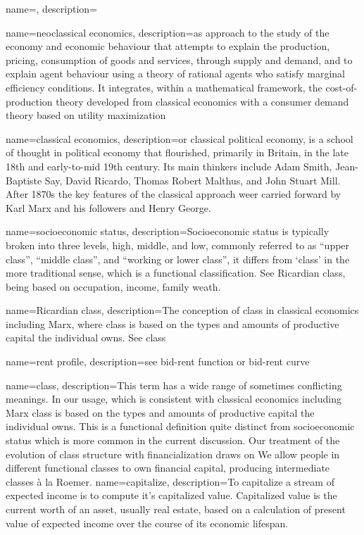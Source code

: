 

\newglossaryentry{}
{
name=,
description={}
}

{
name=neoclassical economics,
description={as approach to the study of the economy and economic behaviour that attempts to explain the production, pricing, consumption of goods and services,  through supply and demand, and to explain agent behaviour using a theory of rational agents who satisfy marginal efficiency conditions. It integrates, within a mathematical framework, the cost-of-production theory  developed from \gls{classical economics} with a consumer demand theory based on utility maximization   }
}

{
name=classical economics,
description={or classical political economy, is a school of thought in political economy that flourished, primarily in Britain, in the late 18th and early-to-mid 19th century. Its main thinkers include Adam Smith, Jean-Baptiste Say, David Ricardo, Thomas Robert Malthus, and John Stuart Mill. After 1870s the key features of the classical approach weer carried forward by  Karl Marx and his followers and  Henry George.  }
}

{
name=socioeconomic status,
description={Socioeconomic status is typically broken into three levels, high, middle, and low,  commonly referred to as ``upper class'', ``middle class'', and ``working or lower class'', it differs from `\gls{class}' in the more traditional sense, which is a functional classification. See \gls{Ricardian class}, being based on occupation, income, family weath.   }
}

{
name=Ricardian class,
description={The conception of class in \gls{classical economics} including Marx, where class is based on the types and amounts of productive capital the individual owns. See \gls{class}}
}

{
name=rent profile,
description={see \gls{bid-rent function} or \gls{bid-rent curve}}
}

{
name=class,
description={This term has a wide range of sometimes conflicting meanings. In our usage, which is consistent with classical economics including Marx class is based on the types and amounts of productive capital the individual owns. This is a functional definition quite distinct from socioeconomic status which is more common in the current discussion. Our treatment of the evolution of class structure with financialization draws on We allow  people in different functional classes to own financial capital, producing intermediate classes \`a la Roemer\cite{roemerGeneralTheoryExploitation1982}.}
}
{
name=capitalize,
description={To capitalize a stream of expected income is to compute it's capitalized value. Capitalized value is the current worth of an asset, usually real estate, based on a calculation of present value of expected income over the course of its economic lifespan. }
}

